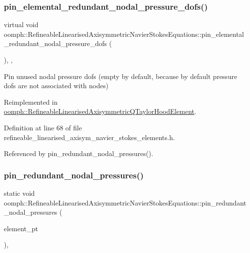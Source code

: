 \subsubsection{\texorpdfstring{pin\+\_\+elemental\+\_\+redundant\+\_\+nodal\+\_\+pressure\+\_\+dofs()}{pin\_elemental\_redundant\_nodal\_pressure\_dofs()}}
{\footnotesize\ttfamily virtual void oomph\+::\+Refineable\+Linearised\+Axisymmetric\+Navier\+Stokes\+Equations\+::pin\+\_\+elemental\+\_\+redundant\+\_\+nodal\+\_\+pressure\+\_\+dofs (\begin{DoxyParamCaption}{ }\end{DoxyParamCaption})\hspace{0.3cm}{\ttfamily [inline]}, {\ttfamily [protected]}, {\ttfamily [virtual]}}



Pin unused nodal pressure dofs (empty by default, because by default pressure dofs are not associated with nodes) 



Reimplemented in \hyperlink{classoomph_1_1RefineableLinearisedAxisymmetricQTaylorHoodElement_addc0cedf610bb49e08d90bf541cab4f5}{oomph\+::\+Refineable\+Linearised\+Axisymmetric\+Q\+Taylor\+Hood\+Element}.



Definition at line 68 of file refineable\+\_\+linearised\+\_\+axisym\+\_\+navier\+\_\+stokes\+\_\+elements.\+h.



Referenced by pin\+\_\+redundant\+\_\+nodal\+\_\+pressures().

\mbox{\label{classoomph_1_1RefineableLinearisedAxisymmetricNavierStokesEquations_ac51e936ed49a6cc6a86119730bb78cd1}} 
\subsubsection{\texorpdfstring{pin\+\_\+redundant\+\_\+nodal\+\_\+pressures()}{pin\_redundant\_nodal\_pressures()}}
{\footnotesize\ttfamily static void oomph\+::\+Refineable\+Linearised\+Axisymmetric\+Navier\+Stokes\+Equations\+::pin\+\_\+redundant\+\_\+nodal\+\_\+pressures (\begin{DoxyParamCaption}\item[{const \hyperlink{classoomph_1_1Vector}{Vector}$<$ \hyperlink{classoomph_1_1GeneralisedElement}{Generalised\+Element} $\ast$$>$ \&}]{element\+\_\+pt }\end{DoxyParamCaption})\hspace{0.3cm}{\ttfamily [inline]}, {\ttfamily [static]}}



